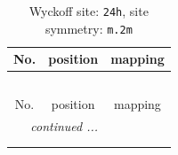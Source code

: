 \documentclass[fleqn,8pt]{jsarticle}
\begin{document}
\renewcommand{\arraystretch}{1.2}
\begin{longtable}{ccc}
\caption{Wyckoff site: {\tt 24h}, site symmetry: {\tt m.2m}}
 \\
 \hline \hline
No. & position & mapping \\ \hline \endfirsthead

\multicolumn{2}{l}{\tablename\ \thetable{}} \\
 \hline \hline
No. & position & mapping \\ \hline \endhead

 \hline \hline
\multicolumn{2}{r}{\footnotesize\it continued ...} \\ \endfoot

 \hline \hline
\multicolumn{2}{r}{} \\ \endlastfoot


\end{longtable}
\end{document}
